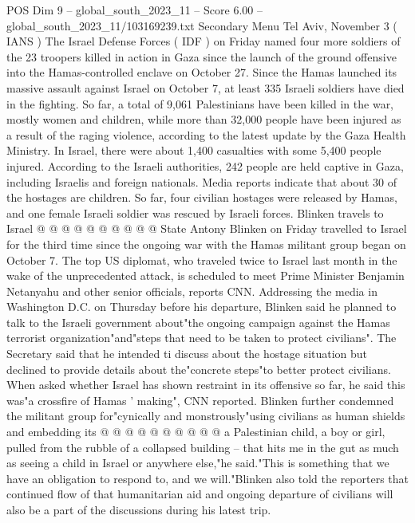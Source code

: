 \begin{textsample}{POS Dim 9 – global\_south\_2023\_11 – Score 6.00 – global\_south\_2023\_11/103169239.txt}  \label{ex:f9_pos_030}
Secondary Menu Tel Aviv, November 3 ( IANS ) The Israel Defense Forces ( IDF ) on Friday named four more soldiers of the 23 troopers killed in action in Gaza since the launch of the ground offensive into the Hamas-controlled enclave on October 27.
Since the Hamas launched its massive assault against Israel on October 7, at least 335 Israeli soldiers have died in the fighting.
So far, a total of 9,061 Palestinians have been killed in the war, mostly women and children, while more than 32,000 people have been injured as a result of the raging violence, according to the latest update by the Gaza Health Ministry.
In Israel, there were about 1,400 casualties with some 5,400 people injured.
According to the Israeli authorities, 242 people are held captive in Gaza, including Israelis and foreign nationals.
Media reports indicate that about 30 of the hostages are children.
So far, four civilian hostages were released by Hamas, and one female Israeli soldier was rescued by Israeli forces.
Blinken travels to Israel @ @ @ @ @ @ @ @ @ @ State Antony Blinken on Friday travelled to Israel for the third time since the ongoing war with the Hamas militant group began on October 7.
The top US diplomat, who traveled twice to Israel last month in the wake of the unprecedented attack, is scheduled to meet Prime Minister Benjamin Netanyahu and other senior officials, reports CNN.
Addressing the media in Washington D.C. on Thursday before his departure, Blinken said he planned to talk to the Israeli government about"the ongoing campaign against the Hamas terrorist organization"and"steps that need to be taken to protect civilians".
The Secretary said that he intended ti discuss about the hostage situation but declined to provide details about the"concrete steps"to better protect civilians.
When asked whether Israel has shown restraint in its offensive so far, he said this was"a crossfire of Hamas ' making", CNN reported.
Blinken further condemned the militant group for"cynically and monstrously"using civilians as human shields and embedding its @ @ @ @ @ @ @ @ @ @ a Palestinian child, a boy or girl, pulled from the rubble of a collapsed building -- that hits me in the gut as much as seeing a child in Israel or anywhere else,"he said."This is something that we have an obligation to respond to, and we will."Blinken also told the reporters that continued flow of that humanitarian aid and ongoing departure of civilians will also be a part of the discussions during his latest trip.

\end{textsample}
